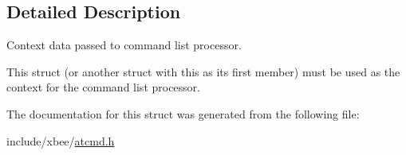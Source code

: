\subsection{Detailed Description}
Context data passed to command list processor. 

This struct (or another struct with this as its first member) must be used as the context for the command list processor. 

The documentation for this struct was generated from the following file\-:\begin{DoxyCompactItemize}
\item 
include/xbee/\hyperlink{atcmd_8h}{atcmd.\-h}\end{DoxyCompactItemize}
